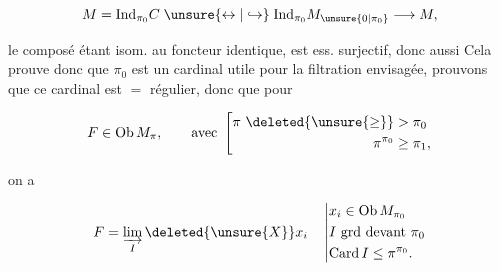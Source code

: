 \[ M=\mathrm{Ind}_{\pi_0}C\mathrel{\unsure{\leftrightarrow|\hookrightarrow}}\mathrm{Ind}_{\pi_0}M_{\unsure{0|\pi_0}}\longrightarrow M, \]

le composé étant isom.  au foncteur identique, est ess. surjectif, donc aussi  Cela prouve donc que $\pi_0$ est un cardinal utile pour la filtration envisagée, prouvons que ce cardinal est $=$ régulier, donc que pour

\[ F\in\mathrm{Ob}\,M_{\pi},\qquad\text{avec }\left[\begin{aligned}
\pi\ \deleted{\unsure{\geq}}&>\pi_0\\
\pi^{\pi_0}&\geq\pi_1,
\end{aligned}\right. \]

on a

\[ F=\varinjlim_I \deleted{\unsure{X}}x_i \quad \left|\begin{aligned}
&x_i\in\mathrm{Ob}\,M_{\pi_0}\\
&I\ \text{grd devant }\pi_0\\
&\mathrm{Card}\, I\leq\pi^{\pi_0}.
\end{aligned}\right. \]

